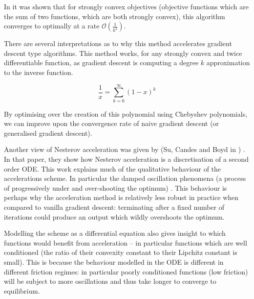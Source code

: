 In \cite{goldstein2014fast} it was shown that for strongly convex objectives (objective functions which are the sum of two functions, which are both strongly convex), this algorithm converges to optimally at a rate \( \mathcal{O}\left( \frac{1}{k^2} \right) \).

There are several interpretations as to why this method accelerates gradient descent type algorithms. This method works, for any strongly convex and twice differentiable function, as gradient descent is computing a degree \(k\) approximation to the inverse function.  

\begin{equation}
\frac{1}{x} = \sum_{k=0}^{\infty} \left(1-x\right)^k
\end{equation}

By optimising over the creation of this polynomial using Chebyshev polynomials, we can improve upon the convergence rate of naive gradient descent (or generalised gradient descent). 

Another view of Nesterov acceleration was given by (Su, Candes and Boyd in \cite{su2014differential}) . In that paper, they show how Nesterov acceleration is a discretisation of a second order ODE. This work explains much of the qualitative behaviour of the accelerations scheme. In particular the damped oscillation phenomena (a process of progressively under and over-shooting the optimum) . This behaviour is perhaps why the acceleration method is relatively less robust in practice when compared to vanilla gradient descent: terminating after a fixed number of iterations could produce an output which wildly overshoots the optimum. 

Modelling the scheme as a differential equation also gives insight to which functions would benefit from acceleration – in particular functions which are well conditioned (the ratio of  their convexity constant to their Lipchitz  constant is small).  This is because the behaviour modelled in the ODE is different in different friction regimes: in particular poorly conditioned functions (low friction) will be subject to more oscillations and thus take longer to converge to equilibrium.